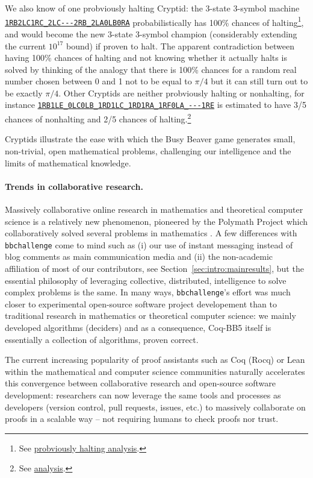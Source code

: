 \documentclass[a4paper,british]{article}
\theoremstyle{definition} %
\numberwithin{equation}{section}
\theoremstyle{definition} %
\newcommand{\tm}[1]{\href{https://bbchallenge.org/#1}{\texttt{\nolinkurl{#1}}}}
\newcommand{\CoqBB}{Coq-BB5\xspace}
\begin{document}
We also know of one probviously halting Cryptid: the 3-state 3-symbol machine \tm{1RB2LC1RC_2LC---2RB_2LA0LB0RA} probabilistically has 100\% chances of halting\footnote{See \href{https://wiki.bbchallenge.org/wiki/1RB2LC1RC_2LC---2RB_2LA0LB0RA}{probviously halting analysis}.}, and would become the new 3-state 3-symbol champion (considerably extending the current $10^{17}$ bound) if proven to halt. The apparent contradiction between having 100\% chances of halting and not knowing whether it actually halts is solved by thinking of the analogy that there is 100\% chances for a random real number chosen between 0 and 1 not to be equal to $\pi/4$ but it can still turn out to be exactly  $\pi/4$. Other Cryptids are neither probviously halting or nonhalting, for instance \tm{1RB1LE_0LC0LB_1RD1LC_1RD1RA_1RF0LA_---1RE} is estimated to have 3/5 chances of nonhalting and 2/5 chances of halting.\footnote{See \href{https://wiki.bbchallenge.org/wiki/1RB1LE_0LC0LB_1RD1LC_1RD1RA_1RF0LA_---1RE}{analysis}.}

Cryptids illustrate the ease with which the Busy Beaver game generates small, non-trivial, open mathematical problems, challenging our intelligence and the limits of mathematical knowledge.

\paragraph{Trends in collaborative research.} Massively collaborative online research in mathematics and theoretical computer science is a relatively new phenomenon, pioneered by the Polymath Project  which collaboratively solved several problems in mathematics \cite{Gowers2009}. A few differences with \texttt{bbchallenge} come to mind such as (i) our use of instant messaging instead of blog comments as main communication media and (ii) the non-academic affiliation of most of our contributors, see Section~\ref{sec:intro:mainresults}, but the essential philosophy of leveraging collective, distributed, intelligence to solve complex problems is the same. In many ways, \texttt{bbchallenge}'s effort was much closer to experimental open-source software project developement than to traditional research in mathematics or theoretical computer science: we mainly developed algorithms (deciders) and as a consequence, \CoqBB itself is essentially a collection of algorithms, proven correct.

The current increasing popularity of proof assistants such as Coq (Rocq) or Lean within the mathematical and computer science communities naturally accelerates this convergence between collaborative research and open-source software development: researchers can now leverage the same tools and processes as developers (version control, pull requests, issues, etc.) to massively collaborate on proofs in a scalable way -- \ie not requiring humans to check proofs nor trust.
\end{document}
